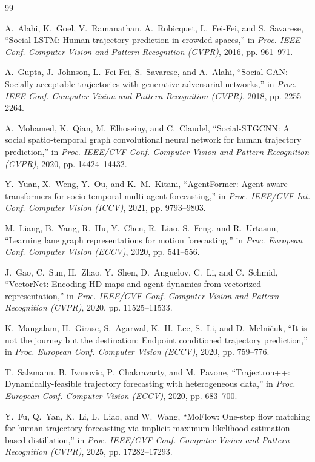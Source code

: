 \begin{thebibliography}{99}
\footnotesize

A.~Alahi, K.~Goel, V.~Ramanathan, A.~Robicquet, L.~Fei-Fei, and S.~Savarese, ``Social LSTM: Human trajectory prediction in crowded spaces,'' in \emph{Proc. IEEE Conf. Computer Vision and Pattern Recognition (CVPR)}, 2016, pp. 961--971.

A.~Gupta, J.~Johnson, L.~Fei-Fei, S.~Savarese, and A.~Alahi, ``Social GAN: Socially acceptable trajectories with generative adversarial networks,'' in \emph{Proc. IEEE Conf. Computer Vision and Pattern Recognition (CVPR)}, 2018, pp. 2255--2264.

A.~Mohamed, K.~Qian, M.~Elhoseiny, and C.~Claudel, ``Social-STGCNN: A social spatio-temporal graph convolutional neural network for human trajectory prediction,'' in \emph{Proc. IEEE/CVF Conf. Computer Vision and Pattern Recognition (CVPR)}, 2020, pp. 14424--14432.

Y.~Yuan, X.~Weng, Y.~Ou, and K.~M.~Kitani, ``AgentFormer: Agent-aware transformers for socio-temporal multi-agent forecasting,'' in \emph{Proc. IEEE/CVF Int. Conf. Computer Vision (ICCV)}, 2021, pp. 9793--9803.

M.~Liang, B.~Yang, R.~Hu, Y.~Chen, R.~Liao, S.~Feng, and R.~Urtasun, ``Learning lane graph representations for motion forecasting,'' in \emph{Proc. European Conf. Computer Vision (ECCV)}, 2020, pp. 541--556.

J.~Gao, C.~Sun, H.~Zhao, Y.~Shen, D.~Anguelov, C.~Li, and C.~Schmid, ``VectorNet: Encoding HD maps and agent dynamics from vectorized representation,'' in \emph{Proc. IEEE/CVF Conf. Computer Vision and Pattern Recognition (CVPR)}, 2020, pp. 11525--11533.

K.~Mangalam, H.~Girase, S.~Agarwal, K.~H.~Lee, S.~Li, and D.~Melni\v{c}uk, ``It is not the journey but the destination: Endpoint conditioned trajectory prediction,'' in \emph{Proc. European Conf. Computer Vision (ECCV)}, 2020, pp. 759--776.

T.~Salzmann, B.~Ivanovic, P.~Chakravarty, and M.~Pavone, ``Trajectron++: Dynamically-feasible trajectory forecasting with heterogeneous data,'' in \emph{Proc. European Conf. Computer Vision (ECCV)}, 2020, pp. 683--700.

Y.~Fu, Q.~Yan, K.~Li, L.~Liao, and W.~Wang, ``MoFlow: One-step flow matching for human trajectory forecasting via implicit maximum likelihood estimation based distillation,'' in \emph{Proc. IEEE/CVF Conf. Computer Vision and Pattern Recognition (CVPR)}, 2025, pp. 17282--17293.


\end{thebibliography}
